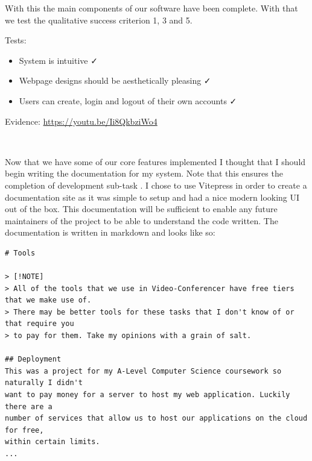 With this the main components of our software have
been complete. With that we test the qualitative
success criterion 1, 3 and 5. \\ \vspace{0.2cm}

{\sffamily Tests:}

\begin{itemize}
  \item System is intuitive \faCheck \\
  \item Webpage designs should be aesthetically pleasing \faCheck \\
  \item Users can create, login and logout of their own accounts \faCheck \\
\end{itemize}

{\sffamily Evidence:} \url{https://youtu.be/Ii8QkbziWo4} \\ \vspace{0.2cm}

{\color{gray} \hrulefill} \\ \vspace{0.2cm}

Now that we have some of our core features implemented I thought that I should begin writing the documentation for
my system. Note that this ensures the completion of development sub-task . I chose to use Vitepress in
order to create a documentation site as it was simple to setup and had a nice modern looking UI out of the box. This
documentation will be sufficient to enable any future maintainers of the project to be able to understand the
code written. The documentation is written in markdown and looks like so:

\begin{verbatim}
# Tools

> [!NOTE]
> All of the tools that we use in Video-Conferencer have free tiers that we make use of.
> There may be better tools for these tasks that I don't know of or that require you
> to pay for them. Take my opinions with a grain of salt.

## Deployment
This was a project for my A-Level Computer Science coursework so naturally I didn't
want to pay money for a server to host my web application. Luckily there are a
number of services that allow us to host our applications on the cloud for free,
within certain limits.
...
\end{verbatim}


